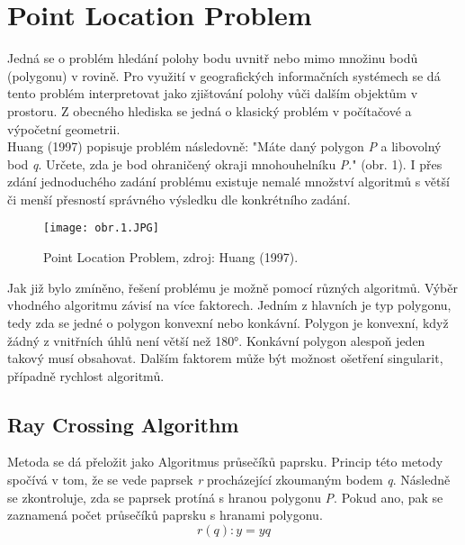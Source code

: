 \documentclass[a4paper,12pt]{article}
\begin{document}
    \newpage
    \section{Point Location Problem}
    Jedná se o problém hledání polohy bodu uvnitř nebo mimo množinu bodů (polygonu) v rovině. Pro využití v geografických informačních systémech se dá tento problém interpretovat jako zjištování polohy vůči dalším objektům v prostoru. Z obecného hlediska se jedná o klasický problém v počítačové a výpočetní geometrii.\\

    Huang (1997) popisuje problém následovně: "Máte daný polygon \emph{P} a libovolný bod \emph{q}. Určete, zda je bod ohraničený okraji mnohouhelníku \emph{P}." (obr. 1). I přes zdání jednoduchého zadání problému existuje nemalé množství algoritmů s větší či menší přesností správného výsledku dle konkrétního zadání. 

    \begin{figure}[h]
    \texttt{[image: obr.1.JPG]}
    \centering
    \caption{Point Location Problem, zdroj: Huang (1997).}
    \label{fig:obr1}
    \end{figure}

    Jak již bylo zmíněno, řešení problému je možně pomocí různých algoritmů. Výběr vhodného algoritmu závisí na více faktorech. Jedním z hlavních je typ polygonu, tedy zda se jedné o polygon konvexní nebo konkávní. Polygon je konvexní, když žádný z vnitřních úhlů není větší než 180°. Konkávní polygon alespoň jeden takový musí obsahovat. Dalším faktorem může být možnost ošetření singularit, případně rychlost algoritmů.\\

    \subsection{ Ray Crossing Algorithm}
    Metoda se dá přeložit jako Algoritmus průsečíků paprsku. Princip této metody spočívá v tom, že se vede paprsek \emph{r} procházející zkoumaným bodem \emph{q}. Následně se zkontroluje, zda se paprsek protíná s hranou polygonu \emph{P}. Pokud ano, pak se zaznamená počet průsečíků paprsku s hranami polygonu.\\
    \begin{equation*}
    r(q) : y = yq 
    \end{equation*}\\
    
\end{document}
